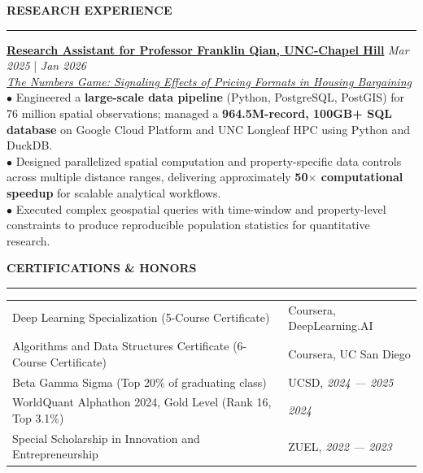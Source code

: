 \documentclass{resume}
\renewcommand{\sectionskip}{\vspace{0.10cm}}
\renewcommand{\sectionlineskip}{\vspace{0.10cm}}
\renewenvironment{rSection}[1]{
\sectionskip
\textcolor{UC San Diego Blue}{\textbf{\large\bfseries\MakeUppercase{#1}}}
\sectionlineskip
\hrule
\begin{list}{}{
\setlength{\leftmargin}{0em}
}
\item[]
}{
\end{list}
}
\begin{document}
\begin{rSection}{RESEARCH EXPERIENCE}
\noindent
\textbf{\href{https://github.com/YuankaiTao-super/Construction-of-Comparable-Housing-Variables}{Research Assistant for Professor Franklin Qian, UNC-Chapel Hill}} \hfill {\em Mar 2025} | {\em Jan 2026}\\
\textit{\href{https://papers.ssrn.com/sol3/papers.cfm?abstract_id=4406954}{The Numbers Game: Signaling Effects of Pricing Formats in Housing Bargaining}}\\[4pt]
$\bullet$ Engineered a \textbf{large-scale data pipeline} (Python, PostgreSQL, PostGIS) for 76 million spatial observations; managed a \textbf{964.5M-record, 100GB+ SQL database} on Google Cloud Platform and UNC Longleaf HPC using Python and DuckDB.\\[1.5pt]
$\bullet$ Designed parallelized spatial computation and property-specific data controls across multiple distance ranges, delivering approximately \textbf{50$\times$ computational speedup} for scalable analytical workflows.\\[1.5pt]
$\bullet$ Executed complex geospatial queries with time-window and property-level constraints to produce reproducible population statistics for quantitative research.
\end{rSection}

\begin{rSection}{Certifications \& Honors}
\begin{tabularx}{\textwidth}{@{} >{\raggedright\arraybackslash}X >{\raggedleft\arraybackslash\hyphenpenalty=10000\exhyphenpenalty=10000}p{4.8cm} @{}}
Deep Learning Specialization (5-Course Certificate) & Coursera, DeepLearning.AI \\
Algorithms and Data Structures Certificate (6-Course Certificate) & Coursera, UC San Diego \\
Beta Gamma Sigma (Top 20\% of graduating class) & UCSD, {\em 2024 --- 2025} \\
WorldQuant Alphathon 2024, Gold Level (Rank 16, Top 3.1\%) & {\em 2024} \\
Special Scholarship in Innovation and Entrepreneurship & ZUEL, {\em 2022 --- 2023}
\end{tabularx}
\end{rSection}
\end{document}

